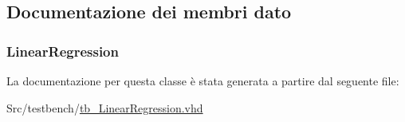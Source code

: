 \subsection{Documentazione dei membri dato}
\hypertarget{classtb___linear_regression_1_1_behavioral_a899499ba78b32b936cd0914831a72c95}{
\subsubsection[{Linear\+Regression}]{ {\bfseries \textcolor{vhdlchar}{ }} \hspace{0.3cm}{\ttfamily [Component]}}}\label{classtb___linear_regression_1_1_behavioral_a899499ba78b32b936cd0914831a72c95}
\hypertarget{classtb___linear_regression_1_1_behavioral_a1619316ad715601eb5d3559db829ac05}{
\subsubsection[{uut}]{ {\bfseries \textcolor{vhdlchar}{Linear\+Regression}\textcolor{vhdlchar}{ }} \hspace{0.3cm}{\ttfamily [Instantiation]}}}\label{classtb___linear_regression_1_1_behavioral_a1619316ad715601eb5d3559db829ac05}


La documentazione per questa classe è stata generata a partire dal seguente file\+:\begin{DoxyCompactItemize}
\item 
Src/testbench/\hyperlink{tb___linear_regression_8vhd}{tb\+\_\+\+Linear\+Regression.\+vhd}\end{DoxyCompactItemize}
